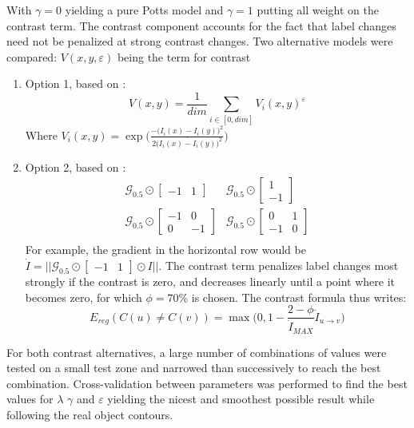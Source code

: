 \documentclass[10pt]{article}
\begin{document}
With $\gamma = 0$ yielding a pure Potts model and $\gamma = 1$ putting all weight on the contrast term. The contrast component accounts for the fact that label changes need not be penalized at strong contrast changes. Two alternative models were compared:
$V(x,y,\varepsilon)$ being the term for contrast
\begin{enumerate}
    \item Option 1, based on \cite{hervieu_fusion_2016,Rother_2004}: 
    \begin{equation}
        V(x,y)=\frac{1}{dim}\sum_{i\in[0,dim]}V_i(x,y)^\varepsilon
    \end{equation}
    Where $V_i(x,y)=\exp\Bigg(\frac{-\big(I_i(x)-I_i(y)\big)^2}{2\big(\overline{I_i(x)-I_i(y)}\big)^2}\Bigg)$
    \item Option 2, based on \cite{schindler_overview_2012}:
    \begin{equation}
        \begin{aligned}
            &\mathcal{G}_{0.5}\odot
            \begin{bmatrix}
            -1 &1
            \end{bmatrix}& \mathcal{G}_{0.5}\odot
            \begin{bmatrix}
            1 \\
            -1
            \end{bmatrix}&\\
            &\mathcal{G}_{0.5}\odot
            \begin{bmatrix}
            -1 & 0 \\
            0 &-1
            \end{bmatrix}&\mathcal{G}_{0.5}\odot
            \begin{bmatrix}
            0& 1 \\
            -1 &0
            \end{bmatrix}&\\
        \end{aligned}
    \end{equation}
    For example, the gradient in the horizontal row would be $\dot{I}=||\mathcal{G}_{0.5}\odot\begin{bmatrix}-1 &1\end{bmatrix}\odot I||$. The contrast term penalizes label changes most strongly if the contrast is zero, and decreases linearly until a point where it becomes zero, for which $\phi=70\%$ is chosen. The contrast formula thus writes:
    \begin{equation}
        E_{reg}(C(u)\neq C(v))=\max\Big(0,1-\frac{2-\phi}{\dot{I}_{MAX}}\dot{I}_{u\rightarrow v}\Big)
    \end{equation}
\end{enumerate}
For both contrast alternatives, a large number of combinations of values were tested on a small test zone and narrowed than successively to reach the best combination. Cross-validation between parameters was performed to find the best values for $\lambda$ $\gamma$ and $\varepsilon$ yielding the nicest and smoothest possible result while following the real object contours.\\
\end{document}
